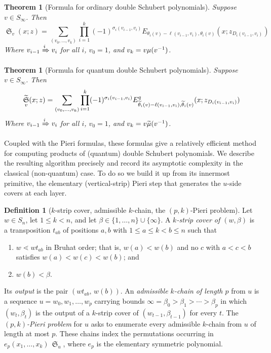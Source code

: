 \documentclass{amsart}
\newtheorem{theorem}[lemma]{Theorem}
\theoremstyle{definition}
\newtheorem{definition}[lemma]{Definition}
\theoremstyle{remark}
\numberwithin{equation}{section}
\DeclareMathOperator{\sch}{\mathfrak{S}}
\DeclareMathOperator{\qsch}{\widetilde{\mathfrak{S}}}
\begin{document}
\begin{theorem}[Formula for ordinary double Schubert polynomials] \label{theorem:orddouble}
Suppose $v\in S_\infty$. Then
$$\sch_v(x;z)=\sum_{(v_0,\ldots,v_k)}\prod_{i=1}^k (-1)^{\sigma_i(v_{i-1},v_i)}E_{\theta_i(v)-\ell(v_{i-1},v_i),\theta_i(v)}(x;z_{D_i(v_{i-1},v_i)})$$
Where $v_{i-1}\xRightarrow{i} v_i$ for all $i$, $v_0=1$, and $v_k=v\mu(v^{-1})$.
\end{theorem}


\begin{theorem}[Formula for quantum double Schubert polynomials] \label{theorem:quandouble}
Suppose $v\in S_\infty$. Then
$$\qsch_v(x;z)=\sum_{(v_0,\ldots,v_k)}\prod_{i=1}^k (-1)^{\sigma_i(v_{i-1},v_i)}E_{\thop_i(v)-\ell(v_{i-1},v_i),\thop_i(v)}^q(x;z_{D_i(v_{i-1},v_i)})$$
Where $v_{i-1}\xRightarrow{i} v_i$ for all $i$, $v_0=1$, and $v_k=v\widetilde{\mu}(v^{-1})$.
\end{theorem}

Coupled with the Pieri formulas, these formulas give a relatively efficient method for computing products of (quantum) double Schubert polynomials. We describe the resulting algorithm precisely and record its asymptotic complexity in the classical (non-quantum) case. To do so we build it up from its innermost primitive, the elementary (vertical-strip) Pieri step that generates the $u$-side covers at each layer.

\begin{definition}[$k$-strip cover, admissible $k$-chain, the $(p,k)$-Pieri problem] \label{def:pieriproblem}
Let $w\in S_n$, let $1\leq k<n$, and let $\beta\in\{1,\ldots,n\}\cup\{\infty\}$. A \emph{$k$-strip cover of $(w,\beta)$} is a transposition $t_{ab}$ of positions $a,b$ with $1\leq a\leq k<b\leq n$ such that
\begin{enumerate}
\item $w\lessdot wt_{ab}$ in Bruhat order; that is, $w(a)<w(b)$ and no $c$ with $a<c<b$ satisfies $w(a)<w(c)<w(b)$; and
\item $w(b)<\beta$.
\end{enumerate}
Its \emph{output} is the pair $(wt_{ab},\,w(b))$. An \emph{admissible $k$-chain of length $p$} from $u$ is a sequence $u=w_0,w_1,\ldots,w_p$ carrying bounds $\infty=\beta_0>\beta_1>\cdots>\beta_p$ in which $(w_t,\beta_t)$ is the output of a $k$-strip cover of $(w_{t-1},\beta_{t-1})$ for every $t$. The \emph{$(p,k)$-Pieri problem} for $u$ asks to enumerate every admissible $k$-chain from $u$ of length at most $p$. These chains index the permutations occurring in $e_p(x_1,\ldots,x_k)\,\sch_u$, where $e_p$ is the elementary symmetric polynomial.
\end{definition}
\end{document}

